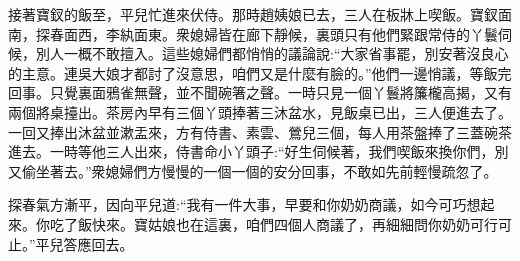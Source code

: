 \begin{parag}
    接著寶釵的飯至，平兒忙進來伏侍。那時趙姨娘已去，三人在板牀上喫飯。寶釵面南，探春面西，李紈面東。衆媳婦皆在廊下靜候，裏頭只有他們緊跟常侍的丫鬟伺候，別人一概不敢擅入。這些媳婦們都悄悄的議論說:“大家省事罷，別安著沒良心的主意。連吳大娘才都討了沒意思，咱們又是什麼有臉的。”他們一邊悄議，等飯完回事。只覺裏面鴉雀無聲，並不聞碗箸之聲。一時只見一個丫鬟將簾櫳高揭，又有兩個將桌擡出。茶房內早有三個丫頭捧著三沐盆水，見飯桌已出，三人便進去了。一回又捧出沐盆並漱盂來，方有侍書、素雲、鶯兒三個，每人用茶盤捧了三蓋碗茶進去。一時等他三人出來，侍書命小丫頭子:“好生伺候著，我們喫飯來換你們，別又偷坐著去。”衆媳婦們方慢慢的一個一個的安分回事，不敢如先前輕慢疏忽了。
\end{parag}


\begin{parag}
    探春氣方漸平，因向平兒道:“我有一件大事，早要和你奶奶商議，如今可巧想起來。你吃了飯快來。寶姑娘也在這裏，咱們四個人商議了，再細細問你奶奶可行可止。”平兒答應回去。
\end{parag}


